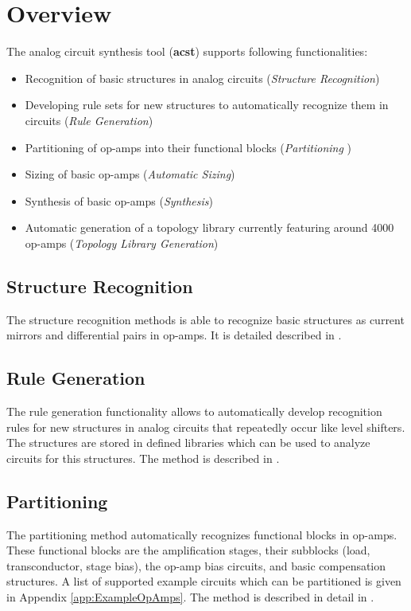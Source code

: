 \chapter{Overview}\label{ch:overview}
The analog circuit synthesis tool ({\bf acst}) supports following functionalities:

\begin{itemize}
	\item Recognition of basic structures in analog circuits ({\em Structure Recognition}) \cite{Massier2008}
	\item Developing rule sets for new structures to automatically recognize them in circuits ({\em Rule Generation}) \cite{Date2021}
	\item Partitioning of op-amps into their functional blocks ({\em Partitioning }) \cite{ABNG20}
	\item Sizing of basic op-amps ({\em Automatic Sizing}) \cite{ABNG20c}
	\item Synthesis of basic op-amps ({\em Synthesis}) \cite{ICCAD,ABNG20d}
	\item Automatic generation of a topology library currently featuring around 4000 op-amps ({\em Topology Library Generation})
\end{itemize}

\section{Structure Recognition}\label{sec:OverviewStructureRecognition}
The structure recognition methods is able to recognize basic structures as current mirrors and differential pairs in op-amps. It is detailed described in \cite{Massier2008, Massier2010}.

\section{Rule Generation}\label{sec:OverviewRuleGeneration}
The rule generation functionality allows to automatically develop recognition rules for new structures in analog circuits that repeatedly occur like level shifters. The structures are stored in  defined  libraries which can be used to analyze circuits for this structures. The method is described in  \cite{Date2021}.

\section{Partitioning}\label{sec:OverviePartitioning}
The partitioning method automatically recognizes functional blocks in op-amps. These functional blocks are the amplification stages, their subblocks (load, transconductor, stage bias), the op-amp bias circuits, and basic compensation structures. A list of  supported example circuits which can be partitioned is given in Appendix \ref{app:ExampleOpAmps}.
The method is described in detail in \cite{ABNG20}.


